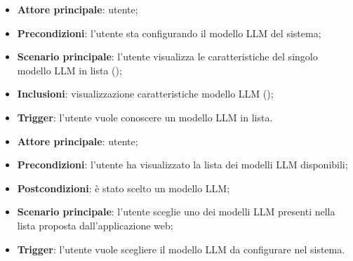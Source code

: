 \documentclass[10pt, a4paper]{article}
\begin{document}
    \begin{itemize}
        \item \textbf{Attore principale}: utente;
        \item \textbf{Precondizioni}: l’utente sta configurando il modello LLM del sistema;
        \item \textbf{Scenario principale}: l'utente visualizza le caratteristiche del singolo modello LLM in lista ();
        \item \textbf{Inclusioni}: visualizzazione caratteristiche modello LLM ();
        \item \textbf{Trigger}: l’utente vuole conoscere un modello LLM in lista.
    \end{itemize}
    
    \begin{itemize}
        \item \textbf{Attore principale}: utente;
        \item \textbf{Precondizioni}: l’utente ha visualizzato la lista dei modelli LLM disponibili;
        \item \textbf{Postcondizioni}: è stato scelto un modello LLM;
        \item \textbf{Scenario principale}: l’utente sceglie uno dei modelli LLM presenti nella lista proposta dall’applicazione web;
        \item \textbf{Trigger}: l’utente vuole scegliere il modello LLM da configurare nel sistema.
    \end{itemize}
\end{document}
